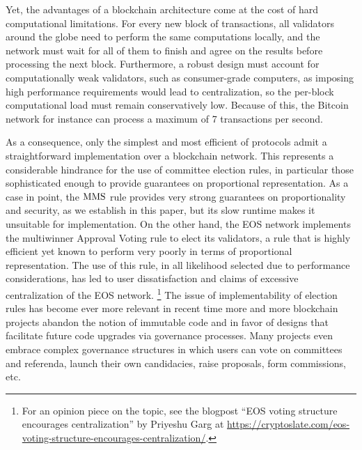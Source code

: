 Yet, the advantages of a blockchain architecture come at the cost of hard computational limitations. For every new block of transactions, all validators around the globe need to perform the same computations locally, and the network must wait for all of them to finish and agree on the results before processing the next block. Furthermore, a robust design must account for computationally weak validators, such as consumer-grade computers, as imposing high performance requirements would lead to centralization, so the per-block computational load must remain conservatively low. Because of this, the Bitcoin network for instance can process a maximum of 7 transactions per second. 

As a consequence, only the simplest and most efficient of protocols admit a straightforward implementation over a blockchain network. This represents a considerable hindrance for the use of committee election rules, in particular those sophisticated enough to provide guarantees on proportional representation. As a case in point, the $\operatorname{MMS}$ rule provides very strong guarantees on proportionality and security, as we establish in this paper, but its slow runtime makes it unsuitable for implementation. On the other hand, the EOS network implements the multiwinner Approval Voting rule to elect its validators, a rule that is highly efficient yet known to perform very poorly in terms of proportional representation. The use of this rule, in all likelihood selected due to performance considerations, has led to user dissatisfaction and claims of excessive centralization of the EOS network.%
\footnote{For an opinion piece on the topic, see the blogpost ``EOS voting structure encourages centralization'' by Priyeshu Garg at \url{https://cryptoslate.com/eos-voting-structure-encourages-centralization/}.}
The issue of implementability of election rules has become ever more relevant in recent time more and more blockchain projects abandon the notion of immutable code and in favor of designs that facilitate future code upgrades via governance processes. Many projects even embrace complex governance structures in which users can vote on committees and referenda, launch their own candidacies, raise proposals, form commissions, etc. 

